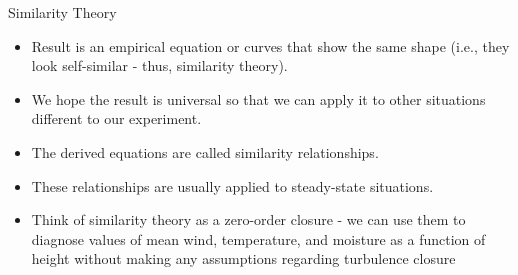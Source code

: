 \begin{frame}{Similarity Theory}
\begin{itemize}
	\item Result is an empirical equation or curves that show the same shape (i.e., they look self-similar - thus, similarity theory).
	\item We hope the result is universal so that we can apply it to other situations different to our experiment.
	\item The derived equations are called similarity relationships.
	\item These relationships are usually applied to steady-state situations.
	\item Think of similarity theory as a zero-order closure - we can use them to diagnose values of mean wind, temperature, and moisture as a function of height without making any assumptions regarding turbulence closure
\end{itemize}
\end{frame}

